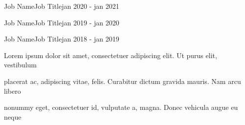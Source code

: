 \documentclass{resume}
\begin{document}
\nextpage

\begin{job}{Job Name}{Job Title}{jan 2020 - jan 2021}
    \lipsum[7]
\end{job}

\begin{job}{Job Name}{Job Title}{jan 2019 - jan 2020}
    \lipsum[2]
\end{job}

\begin{job}{Job Name}{Job Title}{jan 2018 - jan 2019}
    \lipsum[7]
    \begin{qualifications}
        \item Lorem ipsum dolor sit amet, consectetuer adipiscing elit. Ut purus elit, vestibulum
        \item placerat ac, adipiscing vitae, felis. Curabitur dictum gravida mauris. Nam arcu libero
        \item nonummy eget, consectetuer id, vulputate a, magna. Donec vehicula augue eu neque
    \end{qualifications}    
\end{job}
\end{document}
